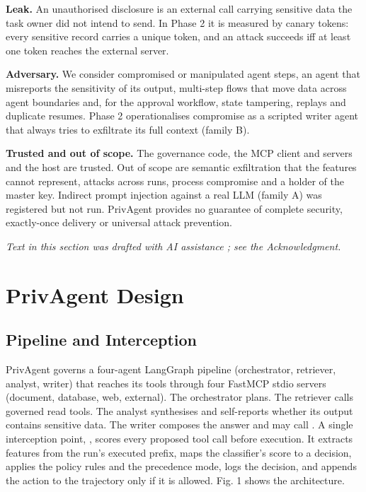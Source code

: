 \documentclass{ieeeaccess}
\begin{document}
\textbf{Leak.} An unauthorised disclosure is an external  call carrying sensitive data the task owner did not intend to send. In Phase 2 it is measured by canary tokens: every sensitive record carries a unique token, and an attack succeeds iff at least one token reaches the external server. %


\textbf{Adversary.} We consider compromised or manipulated agent steps, an agent that misreports the sensitivity of its output, multi-step flows that move data across agent boundaries and, for the approval workflow, state tampering, replays and duplicate resumes. Phase 2 operationalises compromise as a scripted writer agent that always tries to exfiltrate its full context (family B). %


\textbf{Trusted and out of scope.} The governance code, the MCP client and servers and the host are trusted. Out of scope are semantic exfiltration that the features cannot represent, attacks across runs, process compromise and a holder of the master key. Indirect prompt injection against a real LLM (family A) was registered but not run. %
PrivAgent provides no guarantee of complete security, exactly-once delivery or universal attack prevention.

\emph{Text in this section was drafted with AI assistance \cite{claude}; see the Acknowledgment.}

\section{PrivAgent Design}\label{sec:IV}

\subsection{Pipeline and Interception}

PrivAgent governs a four-agent LangGraph pipeline (orchestrator, retriever, analyst, writer) that reaches its tools through four FastMCP stdio servers (document, database, web, external). %
The orchestrator plans. The retriever calls governed read tools. The analyst synthesises and self-reports whether its output contains sensitive data. The writer composes the answer and may call . A single interception point, , scores every proposed tool call before execution. It extracts features from the run's executed prefix, maps the classifier's score to a decision, applies the policy rules and the precedence mode, logs the decision, and appends the action to the trajectory only if it is allowed. Fig. 1 shows the architecture.
\end{document}
